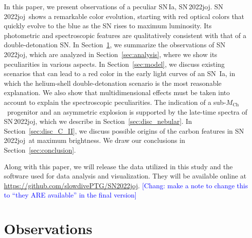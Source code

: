 \documentclass[twocolumn]{aastex631}
\newcommand{\sn}{SN\,2022joj}
\newcommand{\Mch}{$M_\mathrm{Ch}$}
\newcommand{\chang}[1]{\textcolor{blue}{[Chang: #1]}}
\begin{document}
\begin{CJK*}{UTF8}{gbsn}
In this paper, we present observations of a peculiar SN\,Ia, \sn. \sn\ shows a remarkable color evolution, starting with red optical colors that quickly evolve to the blue as the SN rises to maximum luminosity. Its photometric and spectroscopic features are qualitatively consistent with that of a double-detonation SN. In Section~\ref{sec:obs}, we summarize the observations of \sn, which are analyzed in Section~\ref{sec:analysis}, where we show its peculiarities in various aspects. In Section~\ref{sec:model}, we discuss existing scenarios that can lead to a red color in the early light curves of an SN \,Ia, in which the helium-shell double-detonation scenario is the most reasonable explanation. We also show that multidimensional effects must be taken into account to explain the spectroscopic peculiarities. 
The indication of a sub-\Mch\ progenitor and an asymmetric explosion is supported by the late-time spectra of \sn, which we describe in Section~\ref{sec:disc_nebular}. In Section~\ref{sec:disc_C_II}, we discuss possible origins of the carbon features in \sn\ at maximum brightness.
We draw our conclusions in Section~\ref{sec:conclusion}.

Along with this paper, we will release the data utilized in this study and the software used for data analysis and visualization. They will be available online at \url{https://github.com/slowdivePTG/SN2022joj}. \chang{make a note to change this to ``they ARE available'' in the final version}


\section{Observations} \label{sec:obs}

\end{CJK*}
\end{document}
